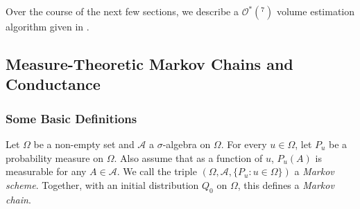 





Over the course of the next few sections, we describe a $\mathcal{O}^*(^7)$ volume estimation algorithm given in \cite{lov-sim-on7}.

\subsection{Measure-Theoretic Markov Chains and Conductance}
\label{subsec: measure theoretic markov chains}

\subsubsection{Some Basic Definitions}

\begin{fdef}
	Let $\Omega$ be a non-empty set and $\mathcal{A}$ a $\sigma$-algebra on $\Omega$. For every $u\in\Omega$, let $P_u$ be a probability measure on $\Omega$. Also assume that as a function of $u$, $P_u(A)$ is measurable for any $A\in\mathcal{A}$. We call the triple $(\Omega,\mathcal{A},\{P_u:u\in\Omega\})$ a \textit{Markov scheme}. Together, with an initial distribution $Q_0$ on $\Omega$, this defines a \textit{Markov chain}.
\end{fdef}

